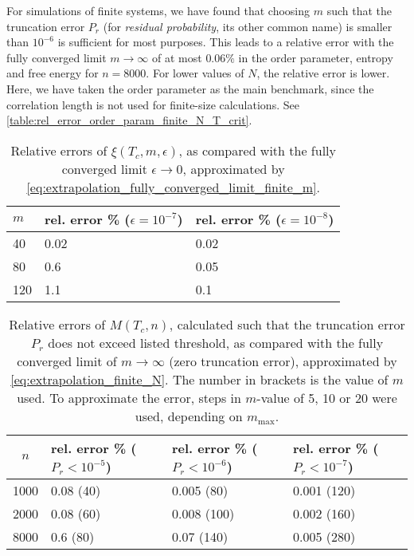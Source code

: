 For simulations of finite systems, we have found that choosing $m$ such that the truncation error $P_r$ (for
\emph{residual probability}, its other common name) is smaller than $10^{-6}$ is sufficient for most purposes.
This leads to a relative error with the fully converged limit $m \to \infty$ of at most $0.06\%$ in the order parameter,
entropy and free energy for $n = 8000$.
For lower values of $N$, the relative error is lower.
Here, we have taken the order parameter as the main benchmark, since the correlation length is not used for finite-size
calculations. See \autoref{table:rel_error_order_param_finite_N_T_crit}.

\begin{table}[]
\centering
\begin{tabular}{@{}lll@{}}
$m$ & rel. error \% ($\epsilon = 10^{-7}$) & rel. error \% ($\epsilon = 10^{-8}$) \\ \midrule
40  & 0.02                              & 0.02                              \\
80  & 0.6                               & 0.05                              \\
120 & 1.1                               & 0.1                               \\ \bottomrule
\end{tabular}
\caption{Relative errors of $\xi(T_c, m, \epsilon)$, as compared with the fully converged limit $\epsilon \to 0$,
approximated by
\autoref{eq:extrapolation_fully_converged_limit_finite_m}.}\label{table:rel_error_correlation_length_finite_m_T_crit}
\end{table}

\begin{table}[]
\centering
\begin{tabularx}{\linewidth}{cXXX}
$n$ & rel. error \% ($ P_r < 10^{-5} $)  & rel. error \% ($P_r < 10^{-6}$) & rel. error \% ($P_r < 10^{-7}$) \\ \midrule
1000  & 0.08 (40)                         & 0.005 (80)    & 0.001 (120)                               \\
2000  & 0.08 (60)                         & 0.008 (100)   & 0.002 (160)                             \\
8000  & 0.6  (80)                         & 0.07  (140)   & 0.005 (280)                              \\ \bottomrule
\end{tabularx}
\caption{Relative errors of $M(T_c, n)$, calculated such that the truncation error $P_r$ does not exceed listed threshold,
as compared with the fully converged limit of $m \to \infty$ (zero truncation error),
approximated by \autoref{eq:extrapolation_finite_N}. The number in brackets is the value of $m$ used. To approximate the error, steps in $m$-value of 5, 10 or 20 were used, depending on $m_{\text{max}}$.} \label{table:rel_error_order_param_finite_N_T_crit}
\end{table}
